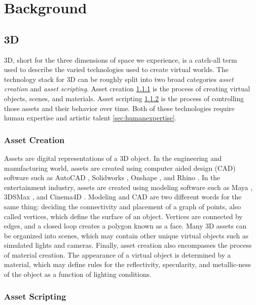 \documentclass{article}
\begin{document}
\section{Background}
\label{sec:background}

\subsection{3D}
\label{sec:3d}

3D, short for the three dimensions of space we experience, is a catch-all term used to describe the varied technologies used to create virtual worlds. The technology stack for 3D can be roughly split into two broad categories \emph{asset creation} and \emph{asset scripting}. Asset creation \ref{sec:assetcreation} is the process of creating virtual objects, scenes, and materials. Asset scripting \ref{sec:assetscripting} is the process of controlling those assets and their behavior over time. Both of these technologies require human expertise and artistic talent \ref{sec:humanexpertise}.
 
\subsubsection{Asset Creation}
\label{sec:assetcreation}

Assets are digital representations of a 3D object. In the engineering and manufacturing world, assets are created using computer aided design (CAD) software such as AutoCAD \citep{autocad}, Solidworks \citep{solidworks}, Onshape \citep{onshape}, and Rhino \citep{rhino}. In the entertainment industry, assets are created using modeling software such as Maya \citep{maya}, 3DSMax \citep{3dsmax}, and Cinema4D \citep{cinema4d}. Modeling and CAD are two different words for the same thing: deciding the connectivity and placement of a graph of points, also called vertices, which define the surface of an object. Vertices are connected by edges, and a closed loop creates a polygon known as a face. Many 3D assets can be organized into scenes, which may contain other unique virtual objects such as simulated lights and cameras. Finally, asset creation also encompasses the process of material creation. The appearance of a virtual object is determined by a material, which may define rules for the reflectivity, specularity, and metallic-ness of the object as a function of lighting conditions.

\subsubsection{Asset Scripting}
\label{sec:assetscripting}
\end{document}

